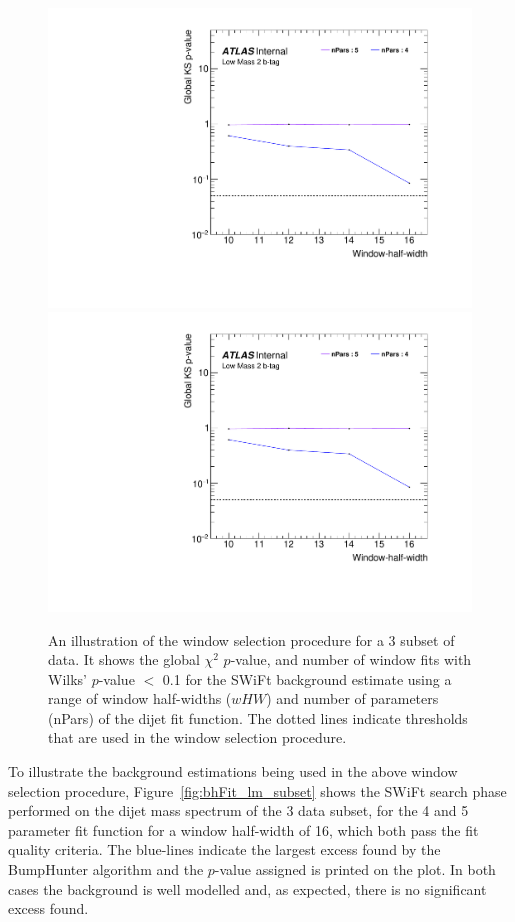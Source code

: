 \begin{figure}[!htb]
\captionsetup[subfigure]{aboveskip=0pt,justification=centering}
\centering
{} {
  \includegraphics[width=0.45\linewidth, angle=0,page=2]{figs/Dibjet/LowMass/FitStudy_min566/windowSel_subset.pdf}
}\hspace{-8mm}
 {
  \includegraphics[width=0.45\linewidth, angle=0,page=4]{figs/Dibjet/LowMass/FitStudy_min566/windowSel_subset.pdf}
}

\caption{\label{fig:windowSel_subset}
  An illustration of the window selection procedure for a 3 \ifb{} subset of \lm{} data.
  It shows the global $\chi^{2}$ \mbox{$p$-value}, %
  and number of window fits with Wilks' \mbox{$p$-value} $<$ 0.1 for the SWiFt background estimate
  using a range of window half-widths ($wHW$) and number of parameters (nPars) of the dijet fit function.
  The dotted lines indicate thresholds that are used in the window selection procedure.
}
\end{figure}

To illustrate the background estimations being used in the above window selection procedure,
Figure~\ref{fig:bhFit_lm_subset} shows the SWiFt search phase performed on the dijet mass spectrum of the 3 \ifb{} data subset,
for the 4 and 5 parameter fit function for a window half-width of 16, which both pass the fit quality criteria.
The blue-lines indicate the largest excess found by the {\sc BumpHunter} algorithm and the \mbox{$p$-value} assigned is printed on the plot. 
In both cases the background is well modelled and, as expected, there is no significant excess found.


